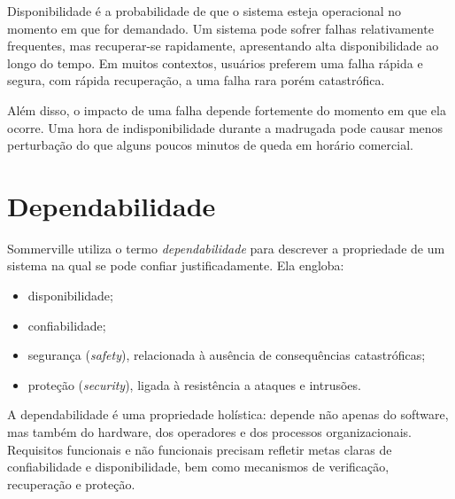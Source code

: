 \documentclass[12pt,a4paper,twoside]{report}
\begin{document}
Disponibilidade é a probabilidade de que o sistema esteja operacional no
momento em que for demandado. Um sistema pode sofrer falhas relativamente
frequentes, mas recuperar-se rapidamente, apresentando alta disponibilidade
ao longo do tempo. Em muitos contextos, usuários preferem uma falha rápida e
segura, com rápida recuperação, a uma falha rara porém catastrófica.

Além disso, o impacto de uma falha depende fortemente do momento em que ela
ocorre. Uma hora de indisponibilidade durante a madrugada pode causar menos
perturbação do que alguns poucos minutos de queda em horário comercial.

\section{Dependabilidade}

Sommerville utiliza o termo \emph{dependabilidade} para descrever a
propriedade de um sistema na qual se pode confiar justificadamente. Ela
engloba:
\begin{itemize}[nosep]
    \item disponibilidade;
    \item confiabilidade;
    \item segurança (\emph{safety}), relacionada à ausência de consequências
    catastróficas;
    \item proteção (\emph{security}), ligada à resistência a ataques e
    intrusões.
\end{itemize}

A dependabilidade é uma propriedade holística: depende não apenas do
software, mas também do hardware, dos operadores e dos processos
organizacionais. Requisitos funcionais e não funcionais precisam refletir
metas claras de confiabilidade e disponibilidade, bem como mecanismos de
verificação, recuperação e proteção.
\end{document}
